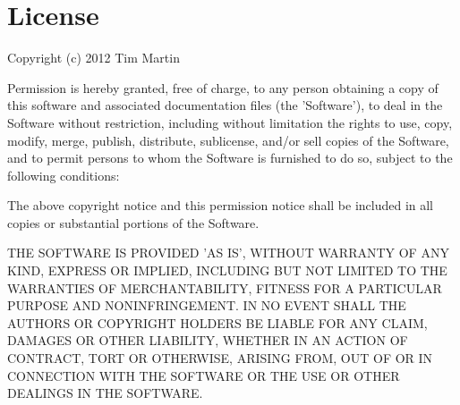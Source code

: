 \documentclass[12pt,letterpaper]{article}
\begin{document}
\section{License}
Copyright (c) 2012 Tim Martin

Permission is hereby granted, free of charge, to any person obtaining
a copy of this software and associated documentation files (the
'Software'), to deal in the Software without restriction, including
without limitation the rights to use, copy, modify, merge, publish,
distribute, sublicense, and/or sell copies of the Software, and to
permit persons to whom the Software is furnished to do so, subject to
the following conditions:

The above copyright notice and this permission notice shall be
included in all copies or substantial portions of the Software.

THE SOFTWARE IS PROVIDED 'AS IS', WITHOUT WARRANTY OF ANY KIND,
EXPRESS OR IMPLIED, INCLUDING BUT NOT LIMITED TO THE WARRANTIES OF
MERCHANTABILITY, FITNESS FOR A PARTICULAR PURPOSE AND NONINFRINGEMENT.
IN NO EVENT SHALL THE AUTHORS OR COPYRIGHT HOLDERS BE LIABLE FOR ANY
CLAIM, DAMAGES OR OTHER LIABILITY, WHETHER IN AN ACTION OF CONTRACT,
TORT OR OTHERWISE, ARISING FROM, OUT OF OR IN CONNECTION WITH THE
SOFTWARE OR THE USE OR OTHER DEALINGS IN THE SOFTWARE.
\end{document}
